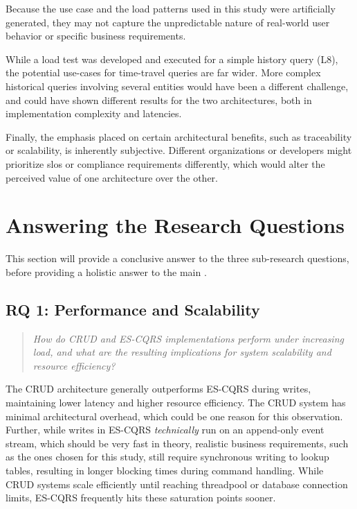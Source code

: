 Because the use case and the load patterns used in this study were artificially generated, they may not capture the unpredictable nature of real-world user behavior or specific business requirements.

While a load test was developed and executed for a simple history query (L8), the potential use-cases for time-travel queries are far wider. More complex historical queries involving several entities would have been a different challenge, and could have shown different results for the two architectures, both in implementation complexity and latencies.

Finally, the emphasis placed on certain architectural benefits, such as traceability or scalability, is inherently subjective. Different organizations or developers might prioritize \glspl{slo} or compliance requirements differently, which would alter the perceived value of one architecture over the other.

\section{Answering the Research Questions}

This section will provide a conclusive answer to the three sub-research questions, before providing a holistic answer to the main .

\subsection{RQ 1: Performance and Scalability}
\label{sec:answering-rq-1}

\begin{quote}
    \textit{How do CRUD and ES-CQRS implementations perform under increasing load, and what are the resulting implications for system scalability and resource efficiency?}
\end{quote}

The CRUD architecture generally outperforms ES-CQRS during writes, maintaining lower latency and higher resource efficiency. The CRUD system has minimal architectural overhead, which could be one reason for this observation. Further, while writes in ES-CQRS \emph{technically} run on an append-only event stream, which should be very fast in theory, realistic business requirements, such as the ones chosen for this study, still require synchronous writing to lookup tables, resulting in longer blocking times during command handling. While CRUD systems scale efficiently until reaching threadpool or database connection limits, ES-CQRS frequently hits these saturation points sooner.

